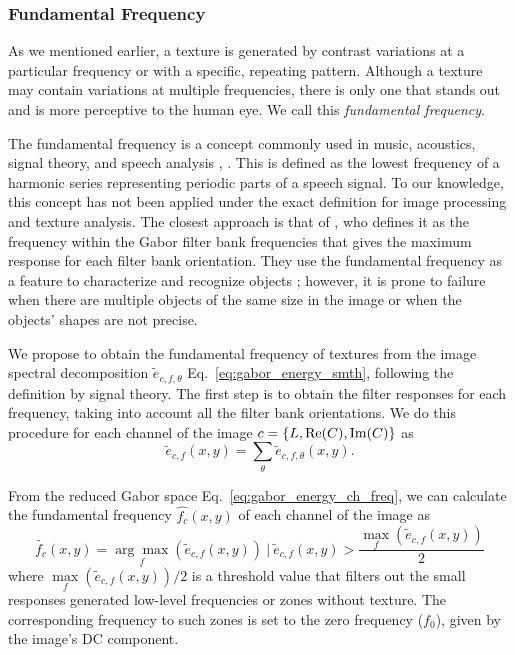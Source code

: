\subsubsection{Fundamental Frequency}
As we mentioned earlier, a texture is generated by contrast variations at a particular frequency or with a specific, repeating pattern. Although a texture may contain variations at multiple frequencies, there is only one that stands out and is more perceptive to the human eye. We call this \textit{fundamental frequency}.

The fundamental frequency is a concept commonly used in music, acoustics, signal theory, and speech analysis \citep{Benward:BOOK:2014}, \citep{Sigmund:ITC:2013}. This is defined as the lowest frequency of a harmonic series representing periodic parts of a speech signal. To our knowledge, this concept has not been applied under the exact definition for image processing and texture analysis. The closest approach is that of \cite{Kamarainen.Kyrki.ea:ICPR:2002}, who defines it as the frequency within the Gabor filter bank frequencies that gives the maximum response for each filter bank orientation. They use the fundamental frequency as a feature to characterize and recognize objects \citep{Kamarainen.Kyrki.ea:DSP:2002}; however, it is prone to failure when there are multiple objects of the same size in the image or when the objects' shapes are not precise.

We propose to obtain the fundamental frequency of textures from the image spectral decomposition $\widetilde{e}_{c, f, \theta}$ Eq.\ \eqref{eq:gabor_energy_smth}, following the definition by signal theory. The first step is to obtain the filter responses for each frequency, taking into account all the filter bank orientations. We do this procedure for each channel of the image $c=\{L, \mathrm{Re}(C), \mathrm{Im}(C)\}$ as
\begin{equation}
	\widetilde{e}_{c, f}(x, y) =  \underset{\theta }{\sum} \widetilde{e}_{c, f, \theta}(x, y).  \label{eq:gabor_energy_ch_freq}
\end{equation}

From the reduced Gabor space Eq.\ \eqref{eq:gabor_energy_ch_freq}, we can calculate the fundamental frequency $\widehat{f_c}(x, y)$ of each channel of the image as
\begin{equation}
	\widetilde{f_c}(x, y) =  \underset{f}{\arg\max} \left(\widetilde{e}_{c, f}(x, y)\right) ~|~ \widetilde{e}_{c, f}(x, y) > \frac{\underset{f}{\max}\left(\widetilde{e}_{c, f}(x, y)\right)}{2} \label{eq:fundamental_frequencygabor_ch}
\end{equation}
where $\underset{f}{\max}\left(\widetilde{e}_{c, f}(x, y)\right)/2$ is a threshold value that filters out the small responses generated low-level frequencies or zones without texture. The corresponding frequency to such zones is set to the zero frequency ($f_0$), given by the image's DC component.

